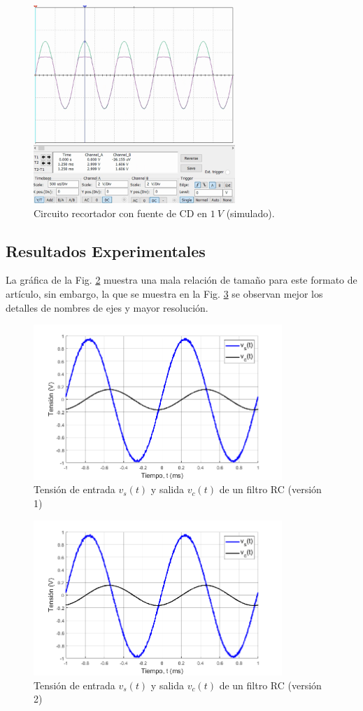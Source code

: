\documentclass[journal]{IEEEtran}
\begin{document}
\begin{figure}[H]
        \centering
        \includegraphics[width=3in]{SignalSimulated_07.png}
        \caption{Circuito recortador con fuente de CD en $1~V$ (simulado).}
        \label{fig:SignalSimulated_07}
\end{figure}

\subsection{Resultados Experimentales}

La gráfica de la Fig. \ref{fig:plot3} muestra una mala relación de tamaño para este formato de artículo, sin embargo, la que se muestra en la Fig. \ref{fig:plot4} se observan mejor los detalles de nombres de ejes y mayor resolución.

\begin{figure}[!ht]
\centering
\includegraphics[width=3.7in]{plot4}
\caption{Tensión de entrada $v_s(t)$ y salida $v_c(t)$ de un filtro RC (versión 1)}
\label{fig:plot3}
\end{figure}

\begin{figure}[!ht] 
\centering
\includegraphics[width=3.7in]{plot4}
\caption{Tensión de entrada $v_s(t)$ y salida $v_c(t)$ de un filtro RC (versión 2)}
\label{fig:plot4}
\end{figure}
\end{document}
